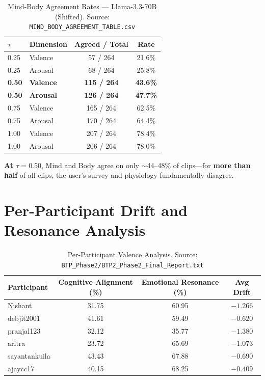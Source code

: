 \documentclass[11pt, a4paper]{report}
\begin{document}
\begin{table}[H]
    \centering
    \small
    \caption{Mind-Body Agreement Rates --- Llama-3.3-70B (Shifted). Source: \texttt{MIND\_BODY\_AGREEMENT\_TABLE.csv}}
    \label{tab:mind-body}
    \begin{tabular}{@{}llcc@{}}
        \toprule
        \textbf{$\tau$} & \textbf{Dimension} & \textbf{Agreed / Total} & \textbf{Rate} \\
        \midrule
        0.25 & Valence & 57 / 264 & 21.6\% \\
        0.25 & Arousal & 68 / 264 & 25.8\% \\
        \textbf{0.50} & \textbf{Valence} & \textbf{115 / 264} & \textbf{43.6\%} \\
        \textbf{0.50} & \textbf{Arousal} & \textbf{126 / 264} & \textbf{47.7\%} \\
        0.75 & Valence & 165 / 264 & 62.5\% \\
        0.75 & Arousal & 170 / 264 & 64.4\% \\
        1.00 & Valence & 207 / 264 & 78.4\% \\
        1.00 & Arousal & 206 / 264 & 78.0\% \\
        \bottomrule
    \end{tabular}
\end{table}

\textbf{At $\tau = 0.50$}, Mind and Body agree on only $\sim$44--48\% of clips---for \textbf{more than half} of all clips, the user's survey and physiology fundamentally disagree.


\section{Per-Participant Drift and Resonance Analysis}

\begin{table}[H]
    \centering
    \small
    \caption{Per-Participant Valence Analysis. Source: \texttt{BTP\_Phase2/BTP2\_Phase2\_Final\_Report.txt}}
    \label{tab:participant-val}
    \begin{tabular}{@{}lccc@{}}
        \toprule
        \textbf{Participant} & \textbf{Cognitive Alignment (\%)} & \textbf{Emotional Resonance (\%)} & \textbf{Avg Drift} \\
        \midrule
        Nishant & 31.75 & 60.95 & $-1.266$ \\
        debjit2001 & 41.61 & 59.49 & $-0.620$ \\
        pranjal123 & 32.12 & 35.77 & $-1.380$ \\
        aritra & 23.72 & 65.69 & $-1.073$ \\
        sayantankuila & 43.43 & 67.88 & $-0.690$ \\
        ajaycc17 & 40.15 & 68.25 & $-0.409$ \\
        \bottomrule
    \end{tabular}
\end{table}
\end{document}
